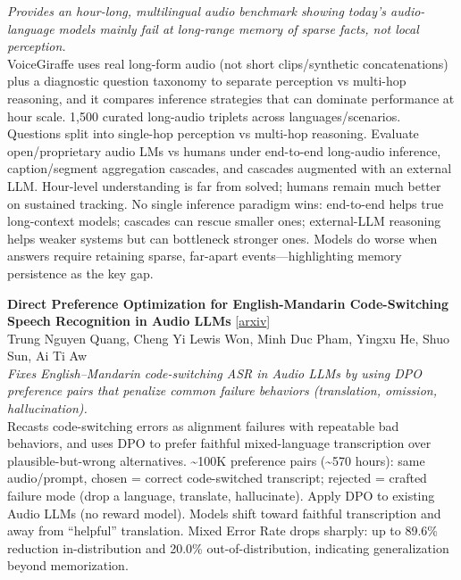 \documentclass[12pt,letterpaper]{article}
\begin{document}
{\small\textit{Provides an hour-long, multilingual audio benchmark showing today's audio-language models mainly fail at long-range memory of sparse facts, not local perception.}}\\[1pt]
{\footnotesize VoiceGiraffe uses real long-form audio (not short clips/synthetic concatenations) plus a diagnostic question taxonomy to separate perception vs multi-hop reasoning, and it compares inference strategies that can dominate performance at hour scale. 1,500 curated long-audio triplets across languages/scenarios. Questions split into single-hop perception vs multi-hop reasoning. Evaluate open/proprietary audio LMs vs humans under end-to-end long-audio inference, caption/segment aggregation cascades, and cascades augmented with an external LLM. Hour-level understanding is far from solved; humans remain much better on sustained tracking. No single inference paradigm wins: end-to-end helps true long-context models; cascades can rescue smaller ones; external-LLM reasoning helps weaker systems but can bottleneck stronger ones. Models do worse when answers require retaining sparse, far-apart events---highlighting memory persistence as the key gap.}

\medskip

{\small\textbf{Direct Preference Optimization for English-Mandarin Code-Switching Speech Recognition in Audio LLMs}} {\scriptsize[\href{https://arxiv.org/abs/2605.23975}{arxiv}]}\\
{\scriptsize Trung Nguyen Quang, Cheng Yi Lewis Won, Minh Duc Pham, Yingxu He, Shuo Sun, Ai Ti Aw}\\

{\small\textit{Fixes English--Mandarin code-switching ASR in Audio LLMs by using DPO preference pairs that penalize common failure behaviors (translation, omission, hallucination).}}\\[1pt]
{\footnotesize Recasts code-switching errors as alignment failures with repeatable bad behaviors, and uses DPO to prefer faithful mixed-language transcription over plausible-but-wrong alternatives. \textasciitilde{}100K preference pairs (\textasciitilde{}570 hours): same audio/prompt, chosen = correct code-switched transcript; rejected = crafted failure mode (drop a language, translate, hallucinate). Apply DPO to existing Audio LLMs (no reward model). Models shift toward faithful transcription and away from ``helpful'' translation. Mixed Error Rate drops sharply: up to 89.6\% reduction in-distribution and 20.0\% out-of-distribution, indicating generalization beyond memorization.}
\end{document}
